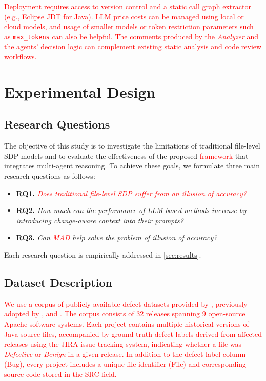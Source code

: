 \documentclass[authoryear,final,5p,times,twocolumn]{elsarticle}
\theoremstyle{plain}
\begin{document}
\textcolor{red}{
Deployment requires access to version control and a static call graph extractor (e.g., Eclipse JDT for Java). LLM price costs can be managed using local or cloud models, and usage of smaller models or token restriction parameters such as \texttt{max\_tokens} can also be helpful. The comments produced by the \emph{Analyzer} and the agents’ decision logic can complement existing static analysis and code review workflows.}

\section{Experimental Design}
\label{sec:experimental_design}

\subsection{Research Questions}
\label{sec:research_questions}

The objective of this study is to investigate the limitations of traditional 
file-level SDP models and to evaluate the effectiveness 
of the proposed \textcolor{red}{framework} that integrates multi-agent 
reasoning. To achieve these goals, we formulate three main research questions as follows:

\begin{itemize}
    \item \textbf{RQ1.} \textit{ \textcolor{red}{Does traditional file-level SDP suffer from an illusion of accuracy?}}
    \vspace{1em}
    \item \textbf{RQ2.} \textit{How much can the performance of LLM-based methods increase by introducing change-aware context into their prompts?}
    \vspace{1em}
    \item \textbf{RQ3.} \textit{Can \textcolor{red}{MAD} help solve the problem of illusion of accuracy?}
\end{itemize}

Each research question is empirically addressed in \autoref{sec:results}.

\subsection{Dataset Description}
\label{sec:dataset_desc}

\textcolor{red}{
We use a corpus of publicly-available defect datasets provided by \citet{Yatish}, previously adopted by \citet{wattanakriengkrai2020predicting}, \citet{pornprasit2023deeplinedp} and \citet{hesamolhokama2024sdperl}. The corpus consists of 32 releases spanning 9 open-source Apache software systems. Each project contains multiple historical versions of Java source files, accompanied by ground-truth defect labels derived from affected releases using the JIRA issue tracking system, indicating whether a file was \textit{Defective} or \textit{Benign} in a given release. In addition to the defect label column (Bug), every project includes a unique file identifier (File) and corresponding source code stored in the SRC field.
}
\end{document}
